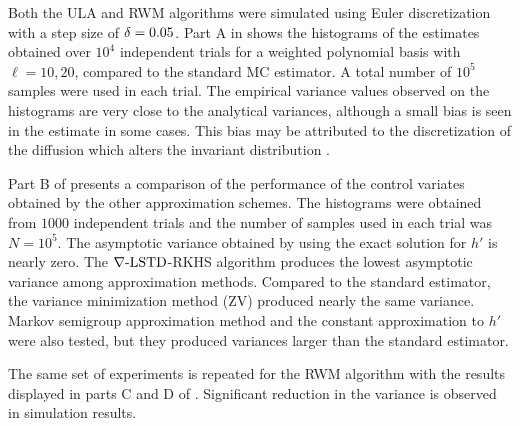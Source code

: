 Both the ULA and RWM algorithms were simulated using Euler discretization with a step size of $\delta = 0.05$. Part A in  shows the histograms of the estimates obtained over $10^4$ independent trials for a weighted polynomial basis with $\ell= 10,20$, compared to the standard MC estimator. A total number of $10^5$ samples were used in each trial. The empirical variance values observed on the histograms are very close to the analytical variances, although a small bias is seen in the estimate in some cases. This bias may be attributed to the discretization of the diffusion which alters the invariant distribution \cite{robtwe96}.  %

Part B of  presents a comparison of the performance of the control variates obtained by the other approximation schemes. The histograms were obtained from $1000$ independent trials and the number of samples used in each trial was $N=10^5$. The asymptotic variance obtained by using the exact solution for $h'$ is nearly zero. The $\nabla\text{-LSTD}$-RKHS algorithm produces the lowest asymptotic variance among approximation methods. Compared to the standard estimator, the variance minimization method (ZV) \cite{papmirgir14} produced nearly the same variance. Markov semigroup approximation method \cite{tagmeh16a} and the constant approximation to $h'$ were also tested, but they produced variances larger than the standard estimator.

The same set of experiments is repeated for the RWM algorithm with the results displayed in parts C and D of . Significant reduction in the variance is observed in simulation results. %

